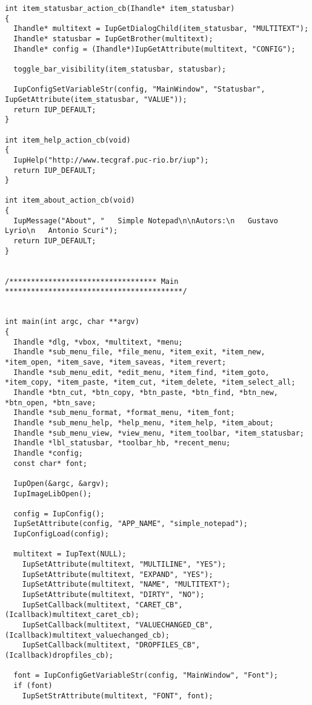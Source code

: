 \documentclass{ctexart}
\begin{document}
\begin{lstlisting}
int item_statusbar_action_cb(Ihandle* item_statusbar)
{
  Ihandle* multitext = IupGetDialogChild(item_statusbar, "MULTITEXT");
  Ihandle* statusbar = IupGetBrother(multitext);
  Ihandle* config = (Ihandle*)IupGetAttribute(multitext, "CONFIG");

  toggle_bar_visibility(item_statusbar, statusbar);

  IupConfigSetVariableStr(config, "MainWindow", "Statusbar", IupGetAttribute(item_statusbar, "VALUE"));
  return IUP_DEFAULT;
}

int item_help_action_cb(void)
{
  IupHelp("http://www.tecgraf.puc-rio.br/iup");
  return IUP_DEFAULT;
}

int item_about_action_cb(void)
{
  IupMessage("About", "   Simple Notepad\n\nAutors:\n   Gustavo Lyrio\n   Antonio Scuri");
  return IUP_DEFAULT;
}


/********************************** Main *****************************************/


int main(int argc, char **argv)
{
  Ihandle *dlg, *vbox, *multitext, *menu;
  Ihandle *sub_menu_file, *file_menu, *item_exit, *item_new, *item_open, *item_save, *item_saveas, *item_revert;
  Ihandle *sub_menu_edit, *edit_menu, *item_find, *item_goto, *item_copy, *item_paste, *item_cut, *item_delete, *item_select_all;
  Ihandle *btn_cut, *btn_copy, *btn_paste, *btn_find, *btn_new, *btn_open, *btn_save;
  Ihandle *sub_menu_format, *format_menu, *item_font;
  Ihandle *sub_menu_help, *help_menu, *item_help, *item_about;
  Ihandle *sub_menu_view, *view_menu, *item_toolbar, *item_statusbar;
  Ihandle *lbl_statusbar, *toolbar_hb, *recent_menu;
  Ihandle *config;
  const char* font;

  IupOpen(&argc, &argv);
  IupImageLibOpen();

  config = IupConfig();
  IupSetAttribute(config, "APP_NAME", "simple_notepad");
  IupConfigLoad(config);

  multitext = IupText(NULL);
    IupSetAttribute(multitext, "MULTILINE", "YES");
    IupSetAttribute(multitext, "EXPAND", "YES");
    IupSetAttribute(multitext, "NAME", "MULTITEXT");
    IupSetAttribute(multitext, "DIRTY", "NO");
    IupSetCallback(multitext, "CARET_CB", (Icallback)multitext_caret_cb);
    IupSetCallback(multitext, "VALUECHANGED_CB", (Icallback)multitext_valuechanged_cb);
    IupSetCallback(multitext, "DROPFILES_CB", (Icallback)dropfiles_cb);

  font = IupConfigGetVariableStr(config, "MainWindow", "Font");
  if (font)
    IupSetStrAttribute(multitext, "FONT", font);


\end{lstlisting}
\end{document}
